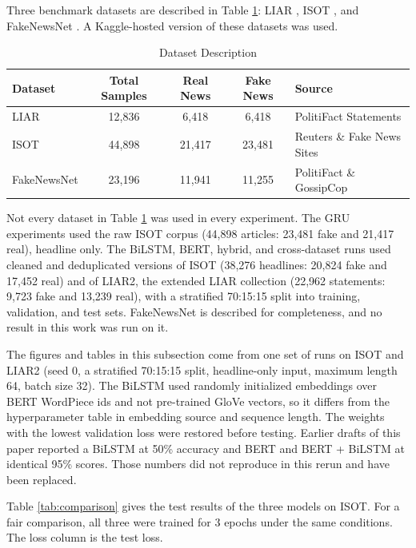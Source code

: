\documentclass[runningheads]{llncs}
\begin{document}
Three benchmark datasets are described in Table \ref{tab:datasets}: LIAR \cite{Wang2017Liar}, ISOT \cite{ISOTDataset}, and FakeNewsNet \cite{Shu2020FakeNewsNet}. A Kaggle-hosted version of these datasets was used.

\begin{table}[h]
\centering
\caption{Dataset Description}
\label{tab:datasets}
\begin{tabular}{|l|c|c|c|l|}
\hline
\textbf{Dataset} & \textbf{Total Samples} & \textbf{Real News} & \textbf{Fake News} & \textbf{Source} \\ \hline
LIAR & 12,836 & 6,418 & 6,418 & PolitiFact Statements \\
ISOT & 44,898 & 21,417 & 23,481 & Reuters \& Fake News Sites \\
FakeNewsNet & 23,196 & 11,941 & 11,255 & PolitiFact \& GossipCop \\ \hline
\end{tabular}
\end{table}

Not every dataset in Table \ref{tab:datasets} was used in every experiment. The GRU experiments used the raw ISOT corpus (44,898 articles: 23,481 fake and 21,417 real), headline only. The BiLSTM, BERT, hybrid, and cross-dataset runs used cleaned and deduplicated versions of ISOT (38,276 headlines: 20,824 fake and 17,452 real) and of LIAR2, the extended LIAR collection (22,962 statements: 9,723 fake and 13,239 real), with a stratified 70:15:15 split into training, validation, and test sets. FakeNewsNet is described for completeness, and no result in this work was run on it.

The figures and tables in this subsection come from one set of runs on ISOT and LIAR2 (seed 0, a stratified 70:15:15 split, headline-only input, maximum length 64, batch size 32). The BiLSTM used randomly initialized embeddings over BERT WordPiece ids and not pre-trained GloVe vectors, so it differs from the hyperparameter table in embedding source and sequence length. The weights with the lowest validation loss were restored before testing. Earlier drafts of this paper reported a BiLSTM at 50\% accuracy and BERT and BERT + BiLSTM at identical 95\% scores. Those numbers did not reproduce in this rerun and have been replaced.


Table \ref{tab:comparison} gives the test results of the three models on ISOT. For a fair comparison, all three were trained for 3 epochs under the same conditions. The loss column is the test loss.
\end{document}

